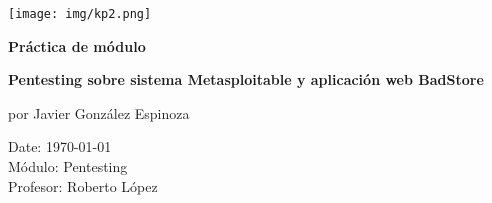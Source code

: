 \documentclass[12pt,oneside,a4paper]{book}
\makeatletter
\renewcommand{\headrulewidth}{0.2pt}
\renewcommand\tableofcontents{%
    \if@twocolumn
      \@restonecoltrue\onecolumn
    \else
      \@restonecolfalse
    \fi
    \section*{\contentsname
        \@mkboth{%
           \MakeUppercase\contentsname}{\MakeUppercase\contentsname}}%
    \@starttoc{toc}%
    \if@restonecol\twocolumn\fi
    }
\makeatother
\begin{document}
\renewcommand{\headrulewidth}{0pt}








\begin{titlepage}
   \thispagestyle{fancy}
   \begin{center}
        \vspace{5em}
   
        \centering\texttt{[image: img/kp2.png]}

        \vspace{5em}

        \huge{\textbf{Práctica de módulo}}

        \vspace{2em}
        
        \huge{\textbf{Pentesting sobre sistema Metasploitable y aplicación web BadStore \\}}
        
        \vspace{5em}

        \Large{por Javier González Espinoza}

        \vspace{7em}
        
   \end{center}

    \normalsize{}
    \normalsize{Date: \today \\
     Módulo: Pentesting \\
     Profesor: Roberto López}
    
\end{titlepage}

\renewcommand{\headrulewidth}{0.2pt}

\newpage

\tableofcontents

\newpage














\end{document}
